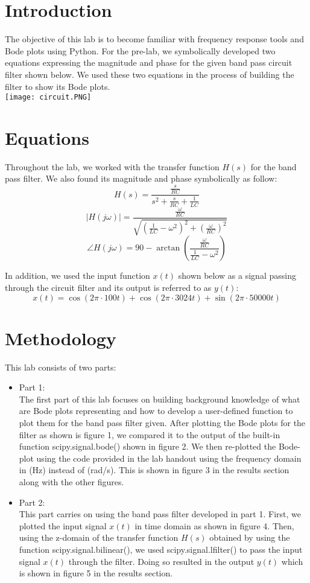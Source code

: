 \documentclass[12pt]{report}
\begin{document}
\section{Introduction}
The objective of this lab is to become familiar with  frequency response tools and Bode plots using Python. For the pre-lab, we symbolically developed two equations expressing the magnitude and phase for the given band pass circuit filter shown below. We used these two equations in the process of building the filter to show its Bode plots.\\
\texttt{[image: circuit.PNG]}

\section{Equations}
Throughout the lab, we worked with the transfer function $H(s)$ for the band pass filter. We also found its magnitude and phase symbolically as follow:\\
$$H(s) = \frac{\frac{s}{RC}}{s^2+\frac{s}{RC}+\frac{1}{LC}}$$
$$|H(j\omega)| = \frac{\frac{\omega}{RC}}{\sqrt{(\frac{1}{LC}-\omega^2)^2+(\frac{\omega}{RC})^2}}$$
$$\angle H(j\omega) = 90 - \arctan(\frac{\frac{\omega}{RC}}{\frac{1}{LC}-\omega^2})$$

In addition, we used the input function $x(t)$ shown below as a signal passing through the circuit filter and its output is referred to as $y(t)$:\\
$$x(t)=\cos(2\pi\cdot100t) + \cos(2\pi\cdot3024t) + \sin(2\pi\cdot50000t)$$

\section{Methodology}
This lab consists of two parts:
\begin{itemize}
    \item
    Part 1:\\
    The first part of this lab focuses on building background knowledge of what are Bode plots representing and how to develop a user-defined function to plot them for the band pass filter given. After plotting the Bode plots for the filter as shown is figure 1, we compared it to the output of the built-in function scipy.signal.bode() shown in figure 2. We then re-plotted the Bode-plot using the code provided in the lab handout using the frequency domain in (Hz) instead of (rad/s). This is shown in figure 3 in the results section along with the other figures.

    \item
    Part 2:\\
    This part carries on using the band pass filter developed in part 1. First, we plotted the input signal $x(t)$ in time domain as shown in figure 4. Then, using the z-domain of the transfer function $H(s)$ obtained by using the function scipy.signal.bilinear(), we used scipy.signal.lfilter() to pass the input signal $x(t)$ through the filter. Doing so resulted in the output $y(t)$ which is shown in figure 5 in the results section.

\end{itemize}
   
\end{document}
